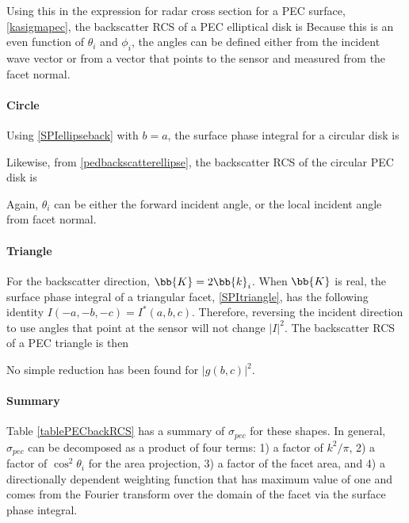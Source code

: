 Using this in the expression for radar cross section for a PEC surface, \eqref{kasigmapec}, the backscatter RCS of a PEC elliptical disk is  
%
Because this is an even function of $\theta_i$ and $\phi_i$, the angles can be defined either from the incident wave vector or from a vector that points to the sensor and measured from the facet normal.  

\paragraph{Circle} Using \eqref{SPIellipseback} with $b=a$, the surface phase integral for a circular disk is

Likewise, from \eqref{pedbackscatterellipse}, the backscatter RCS of the circular PEC disk is

Again, $\theta_i$ can be either the forward incident angle, or the local incident angle from facet normal.

\paragraph{Triangle} For the backscatter direction, $\bb{K} = 2 \bb{k}_i $. When $\bb{K}$ is real, the surface phase integral of a triangular facet, \eqref{SPItriangle}, has the following identity $I(-a,-b,-c) = I^*(a,b,c)$. Therefore, reversing the incident direction to use angles that point at the sensor will not change $\vert I \vert^2$. The backscatter RCS of a PEC triangle is then

No simple reduction has been found for $\vert g(b,c)\vert^2$. 

\paragraph{Summary}
Table \ref{tablePECbackRCS} has a summary of $\sigma_{pec}$ for these shapes. In general, $\sigma_{pec}$ can be decomposed as a product of four terms: 1) a factor of $k^2/\pi$, 2) a factor of $\cos^2\theta_i$ for the area projection, 3) a factor of the facet area, and 4) a directionally dependent weighting function that has maximum value of one and comes from the Fourier transform over the domain of the facet via the surface phase integral. 
 
